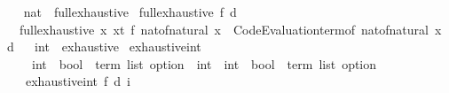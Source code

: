 \begin{isabellebody}
\isanewline
{}\isamarkupfalse%
%
\isadelimproof
\ %
\endisadelimproof
%
\isatagproof
\isacommand{{\isachardot}{\kern0pt}{\isachardot}{\kern0pt}}\isamarkupfalse%
%
\endisatagproof
{\isafoldproof}%
%
\isadelimproof
%
\endisadelimproof
\isanewline
\isanewline
{}\isamarkupfalse%
\isanewline
\isanewline
{}\isamarkupfalse%
\ nat\ {\isacharcolon}{\kern0pt}{\isacharcolon}{\kern0pt}\ full{\isacharunderscore}{\kern0pt}exhaustive\isanewline
{}\isanewline
\isanewline
{}\isamarkupfalse%
\ {\isachardoublequoteopen}full{\isacharunderscore}{\kern0pt}exhaustive\ f\ d\ {\isacharequal}{\kern0pt}\isanewline
\ \ full{\isacharunderscore}{\kern0pt}exhaustive\ {\isacharparenleft}{\kern0pt}{\isasymlambda}{\isacharparenleft}{\kern0pt}x{\isacharcomma}{\kern0pt}\ xt{\isacharparenright}{\kern0pt}{\isachardot}{\kern0pt}\ f\ {\isacharparenleft}{\kern0pt}nat{\isacharunderscore}{\kern0pt}of{\isacharunderscore}{\kern0pt}natural\ x{\isacharcomma}{\kern0pt}\ {\isasymlambda}{\isacharunderscore}{\kern0pt}{\isachardot}{\kern0pt}\ Code{\isacharunderscore}{\kern0pt}Evaluation{\isachardot}{\kern0pt}term{\isacharunderscore}{\kern0pt}of\ {\isacharparenleft}{\kern0pt}nat{\isacharunderscore}{\kern0pt}of{\isacharunderscore}{\kern0pt}natural\ x{\isacharparenright}{\kern0pt}{\isacharparenright}{\kern0pt}{\isacharparenright}{\kern0pt}\ d{\isachardoublequoteclose}\isanewline
\isanewline
{}\isamarkupfalse%
%
\isadelimproof
\ %
\endisadelimproof
%
\isatagproof
\isacommand{{\isachardot}{\kern0pt}{\isachardot}{\kern0pt}}\isamarkupfalse%
%
\endisatagproof
{\isafoldproof}%
%
\isadelimproof
%
\endisadelimproof
\isanewline
\isanewline
{}\isamarkupfalse%
\isanewline
\isanewline
{}\isamarkupfalse%
\ int\ {\isacharcolon}{\kern0pt}{\isacharcolon}{\kern0pt}\ exhaustive\isanewline
{}\isanewline
\isanewline
{}\isamarkupfalse%
\ exhaustive{\isacharunderscore}{\kern0pt}int{\isacharprime}{\kern0pt}\ {\isacharcolon}{\kern0pt}{\isacharcolon}{\kern0pt}\isanewline
\ \ \ \ {\isachardoublequoteopen}{\isacharparenleft}{\kern0pt}int\ {\isasymRightarrow}\ {\isacharparenleft}{\kern0pt}bool\ {\isasymtimes}\ term\ list{\isacharparenright}{\kern0pt}\ option{\isacharparenright}{\kern0pt}\ {\isasymRightarrow}\ int\ {\isasymRightarrow}\ int\ {\isasymRightarrow}\ {\isacharparenleft}{\kern0pt}bool\ {\isasymtimes}\ term\ list{\isacharparenright}{\kern0pt}\ option{\isachardoublequoteclose}\isanewline
\ \ \ {\isachardoublequoteopen}exhaustive{\isacharunderscore}{\kern0pt}int{\isacharprime}{\kern0pt}\ f\ d\ i\ {\isacharequal}{\kern0pt}\isanewline

\end{isabellebody}
